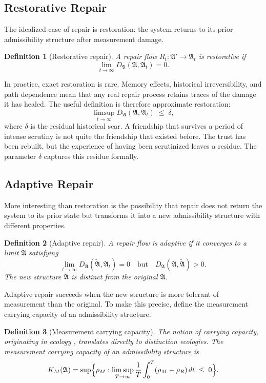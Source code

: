 \documentclass[12pt, a4paper]{article}
\theoremstyle{flyxion}
\newtheorem{definition}{Definition}
\newcommand{\fA}{\mathfrak{A}}
\newcommand{\DA}{D_{\fA}}
\newcommand{\rhoM}{\rho_{M}}
\newcommand{\rhoR}{\rho_{R}}
\newcommand{\KM}{K_{M}}
\newcommand{\tA}{\widetilde{\fA}}
\begin{document}
\subsection*{Restorative Repair}

The idealized case of repair is restoration: the system returns to its prior admissibility structure after measurement damage.

\begin{definition}[Restorative repair]
A repair flow $R_t: \fA' \to \fA_t$ is restorative if
\[
  \lim_{t \to \infty} \DA(\fA, \fA_t) = 0.
\]
\end{definition}

In practice, exact restoration is rare. Memory effects, historical irreversibility, and path dependence mean that any real repair process retains traces of the damage it has healed. The useful definition is therefore approximate restoration:
\[
  \limsup_{t \to \infty} \DA(\fA, \fA_t) \;\leq\; \delta,
\]
where $\delta$ is the residual historical scar. A friendship that survives a period of intense scrutiny is not quite the friendship that existed before. The trust has been rebuilt, but the experience of having been scrutinized leaves a residue. The parameter $\delta$ captures this residue formally.

\subsection*{Adaptive Repair}

More interesting than restoration is the possibility that repair does not return the system to its prior state but transforms it into a new admissibility structure with different properties.

\begin{definition}[Adaptive repair]
A repair flow is adaptive if it converges to a limit $\tA$ satisfying
\[
  \lim_{t \to \infty} \DA(\tA, \fA_t) = 0
  \quad \text{but} \quad
  \DA(\fA, \tA) > 0.
\]
The new structure $\tA$ is distinct from the original $\fA$.
\end{definition}

Adaptive repair succeeds when the new structure is more tolerant of measurement than the original. To make this precise, define the measurement carrying capacity of an admissibility structure.

\begin{definition}[Measurement carrying capacity]
The notion of carrying capacity, originating in ecology \cite{holling1973}, translates directly to distinction ecologies. The measurement carrying capacity of an admissibility structure is
\[
  \KM(\fA) = \sup\Bigl\{
    \rhoM : \limsup_{T\to\infty} \frac{1}{T} \int_0^T (\rhoM - \rhoR)\, dt \;\leq\; 0
  \Bigr\}.
\]
\end{definition}
\end{document}
